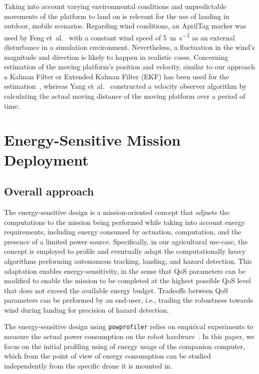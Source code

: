 \documentclass[conference, onecolumn, draftclsnofoot]{IEEEtran}
\newcommand{\stt}[1]{{\small\tt #1}} %
\newcommand{\powprof}{\stt{powprofiler}}
\begin{document}
Taking into account varying environmental conditions and unpredictable
movements of the platform to land on is relevant for the use of
landing in outdoor, mobile scenarios.  Regarding wind conditions, an
AprilTag marker was used by Feng et~al.~\cite{feng2018autonomous} with
a constant wind speed of \SI{5}{\m \per \s} as an external disturbance in a
simulation environment. Nevertheless, a fluctuation in the wind's
magnitude and direction is likely to happen in realistic cases.
Concerning estimation of the moving platform's position and velocity,
similar to our approach a Kalman Filter or Extended Kalman Filter (EKF) has been used for the
estimation~\cite{araar2017vision,feng2018autonomous,
  falanga2017vision}, whereas Yang et~al.~\cite{yang2018hybrid}
constructed a velocity observer algorithm by calculating the actual
moving distance of the moving platform over a period of time.



\section{Energy-Sensitive Mission Deployment} 
\label{sec:approach}

\subsection{Overall approach}

The energy-sensitive design is a mission-oriented concept that adjusts
the computations to the mission being performed while taking into
account energy requirements, including energy consumed by actuation,
computation, and the presence of a limited power source. Specifically,
in our agricultural use-case, the concept is employed to profile and eventually adapt the
computationally heavy algorithms performing autonomous tracking,
landing, and hazard detection. This adaptation enables
energy-sensitivity, in the sense that QoS parameters can be modified
to enable the mission to be completed at the highest possible QoS
level that does not exceed the available energy budget. Tradeoffs
between QoS parameters can be performed by an end-user, i.e., trading
the robustness towards wind during landing for precision of hazard
detection.

The energy-sensitive design using \powprof{} relies on empirical
experiments to measure the actual power consumption on the robot
hardware~\cite{seewald2019coarse}.
%
%
In this paper, we focus on the
initial profiling using of energy usage of the companion computer,
which from the point of view of energy consumption
can be studied independently from the specific drone it is mounted in.
\end{document}
